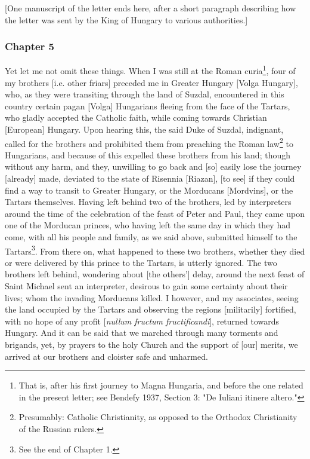 [One manuscript of the letter ends here, after a short paragraph describing how the letter was sent by the King of Hungary to various authorities.]



\subsubsection{Chapter 5}

Yet let me not omit these things. When I was still at the Roman curia\footnote{That is, after his first journey to Magna Hungaria, and before the one related in the present letter; see Bendefy 1937, Section 3: "De Iuliani itinere altero."}, four of my brothers [i.e. other friars] preceded me in Greater Hungary [Volga Hungary], who, as they were transiting through the land of Suzdal, encountered in this country certain pagan [Volga] Hungarians fleeing from the face of the Tartars, who gladly accepted the Catholic faith, while coming towards Christian [European] Hungary. Upon hearing this, the said Duke of Suzdal, indignant, called for the brothers and prohibited them from preaching the Roman law\footnote{Presumably: Catholic Christianity, as opposed to the Orthodox Christianity of the Russian rulers.} to Hungarians, and because of this expelled these brothers from his land; though without any harm, and they, unwilling to go back and [so] easily lose the journey [already] made, deviated to the state of Risennia [Riazan], [to see] if they could find a way to transit to Greater Hungary, or the Morducans [Mordvins], or the Tartars themselves. Having left behind two of the brothers, led by interpreters around the time of the celebration of the feast of Peter and Paul, they came upon one of the Morducan princes, who having left the same day in which they had come, with all his people and family, as we said above, submitted himself to the Tartars\footnote{See the end of Chapter 1.}. From there on, what happened to these two brothers, whether they died or were delivered by this prince to the Tartars, is utterly ignored. The two brothers left behind, wondering about [the others'] delay, around the next feast of Saint Michael sent an interpreter, desirous to gain some certainty about their lives; whom the invading Morducans killed. I however, and my associates, seeing the land occupied by the Tartars and observing the regions [militarily] fortified, with no hope of any profit [\emph{nullum fructum fructificandi}], returned towards Hungary. And it can be said that we marched through many torments and brigands, yet, by prayers to the holy Church and the support of [our] merits, we arrived at our brothers and cloister safe and unharmed.

